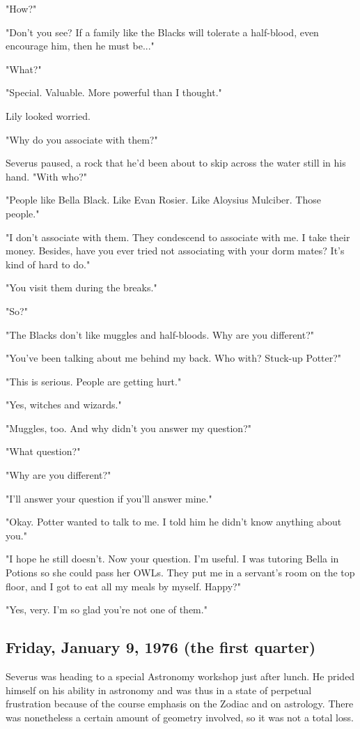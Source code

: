 "How?"

"Don't you see? If a family like the Blacks will tolerate a half-blood, even encourage him, then he must be..."

"What?"

"Special. Valuable. More powerful than I thought."

Lily looked worried.

"Why do you associate with them?"

Severus paused, a rock that he'd been about to skip across the water still in his hand. "With who?"

"People like Bella Black. Like Evan Rosier. Like Aloysius Mulciber. Those people."

"I don't associate with them. They condescend to associate with me. I take their money. Besides, have you ever tried not associating with your dorm mates? It's kind of hard to do."

"You visit them during the breaks."

"So?"

"The Blacks don't like muggles and half-bloods. Why are you different?"

"You've been talking about me behind my back. Who with? Stuck-up Potter?"

"This is serious. People are getting hurt."

"Yes, witches and wizards."

"Muggles, too. And why didn't you answer my question?"

"What question?"

"Why are you different?"

"I'll answer your question if you'll answer mine."

"Okay. Potter wanted to talk to me. I told him he didn't know anything about you."

"I hope he still doesn't. Now your question. I'm useful. I was tutoring Bella in Potions so she could pass her OWLs. They put me in a servant's room on the top floor, and I got to eat all my meals by myself. Happy?"

"Yes, very. I'm so glad you're not one of them."

\subsection{Friday, January 9, 1976 (the first quarter)}

Severus was heading to a special Astronomy workshop just after lunch. He prided himself on his ability in astronomy and was thus in a state of perpetual frustration because of the course emphasis on the Zodiac and on astrology. There was nonetheless a certain amount of geometry involved, so it was not a total loss.

